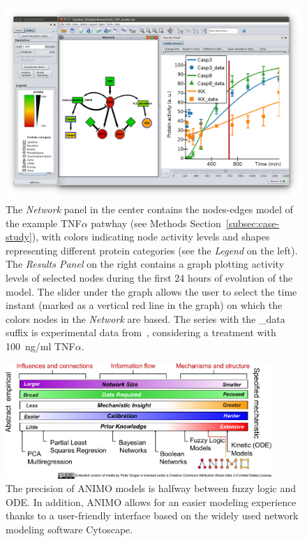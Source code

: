 \documentclass{bmcart}
\begin{document}
\begin{backmatter}
\begin{figure}[htbp]
\begin{center}
   \includegraphics[width=.9\textwidth]{images/screenshotTNFmodelSmall}
\end{center}
\caption{
The \emph{Network} panel in the center contains the nodes-edges
model of the example TNF$\alpha$ patwhay (see Methods Section~\ref{subsec:case-study}), with
colors indicating node activity levels and shapes representing different protein categories (see the \emph{Legend} on the left).
The \emph{Results Panel} on the right contains a graph plotting activity levels of selected nodes
during the first 24 hours of evolution of the model. The slider under the graph
allows the user to select the time instant (marked as a vertical red line in the graph) on which
the colors nodes in the \emph{Network} are based.
The series with the {\sf \_data} suffix is experimental
data from~\cite{pathway-compendium}, considering a treatment with 100~ng/ml TNF$\alpha$.
\label{fig:cytoscape}}
\end{figure}


\begin{figure}[htbp]
 \begin{center}
  \includegraphics[width=0.9\textwidth]{images/modeling_methods_spectrum_animo}
 \end{center}
\caption{
The precision of ANIMO models is halfway between fuzzy logic and ODE. In addition, ANIMO
allows for an easier modeling experience thanks to a user-friendly interface based on
the widely used network modeling software Cytoscape.\label{fig:animo-spectrum}}
\end{figure}





\end{backmatter}
\end{document}
